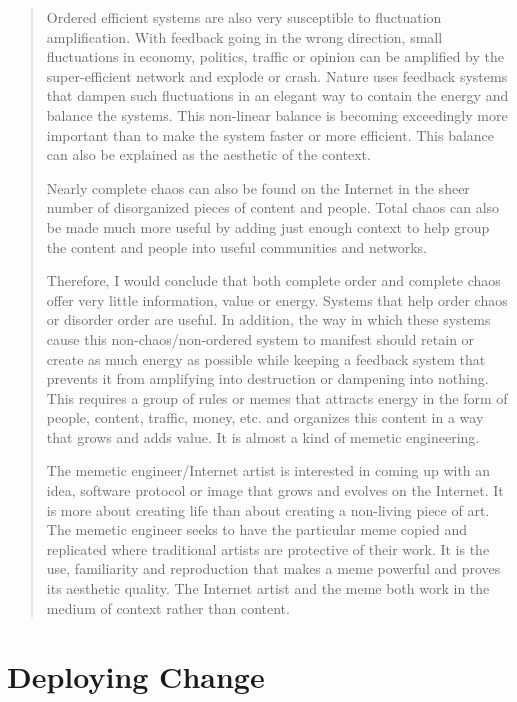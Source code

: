 \begin{quote}
Ordered efficient systems are also very susceptible to fluctuation amplification. With feedback going in the wrong direction, small fluctuations in economy, politics, traffic or opinion can be amplified by the super-efficient network and explode or crash. Nature uses feedback systems that dampen such fluctuations in an elegant way to contain the energy and balance the systems. This non-linear balance is becoming exceedingly more important than to make the system faster or more efficient. This balance can also be explained as the aesthetic of the context.

Nearly complete chaos can also be found on the Internet in the sheer number of disorganized pieces of content and people. Total chaos can also be made much more useful by adding just enough context to help group the content and people into useful communities and networks.

Therefore, I would conclude that both complete order and complete chaos offer very little information, value or energy. Systems that help order chaos or disorder order are useful. In addition, the way in which these systems cause this non-chaos/non-ordered system to manifest should retain or create as much energy as possible while keeping a feedback system that prevents it from amplifying into destruction or dampening into nothing. This requires a group of rules or memes that attracts energy in the form of people, content, traffic, money, etc. and organizes this content in a way that grows and adds value. It is almost a kind of memetic engineering.

The memetic engineer/Internet artist is interested in coming up with an idea, software protocol or image that grows and evolves on the Internet. It is more about creating life than about creating a non-living piece of art. The memetic engineer seeks to have the particular meme copied and replicated where traditional artists are protective of their work. It is the use, familiarity and reproduction that makes a meme powerful and proves its aesthetic quality. The Internet artist and the meme both work in the medium of context rather than content.
\end{quote}

\section{Deploying Change}
